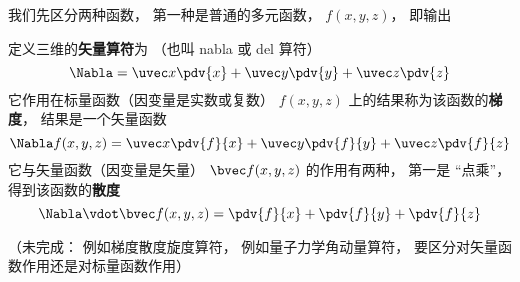

我们先区分两种函数， 第一种是普通的多元函数， $f(x, y, z)$， 即输出

定义三维的\textbf{矢量算符}为 （也叫 nabla 或 del 算符）
\begin{equation}
\Nabla = \uvec x \pdv{x} + \uvec y \pdv{y} + \uvec z \pdv{z}
\end{equation}
它作用在标量函数（因变量是实数或复数） $f(x, y, z)$ 上的结果称为该函数的\textbf{梯度}， 结果是一个矢量函数
\begin{equation}
\Nabla f(x, y, z) = \uvec x \pdv{f}{x} + \uvec y \pdv{f}{y} + \uvec z \pdv{f}{z}
\end{equation}
它与矢量函数（因变量是矢量） $\bvec f(x, y, z)$ 的作用有两种， 第一是 “点乘”， 得到该函数的\textbf{散度}
\begin{equation}
\Nabla \vdot \bvec f(x, y, z) = \pdv{f}{x} + \pdv{f}{y} + \pdv{f}{z}
\end{equation}


（未完成： 例如梯度散度旋度算符， 例如量子力学角动量算符， 要区分对矢量函数作用还是对标量函数作用）
